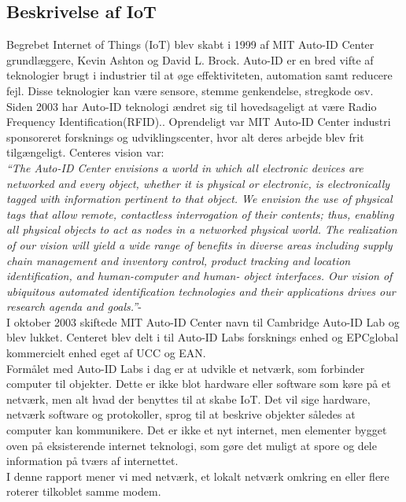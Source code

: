         \subsection{Beskrivelse af IoT}
        
        Begrebet Internet of Things (IoT) blev skabt i 1999 af MIT Auto-ID Center grundlæggere, Kevin Ashton og David L. Brock.\autocite{Hashmi2017} Auto-ID er en bred vifte af teknologier brugt i industrier til at øge effektiviteten, automation samt reducere fejl. Disse teknologier kan være sensore, stemme genkendelse, stregkode osv.
        Siden 2003 har Auto-ID teknologi ændret sig til hovedsageligt at være Radio Frequency Identification(RFID).\autocite{Sundmaeker2010}. Oprendeligt var MIT Auto-ID Center industri sponsoreret forsknings og udviklingscenter, hvor alt deres arbejde blev frit tilgængeligt. Centeres vision var:\\
        \textit{``The Auto-ID Center envisions a world in which all electronic devices are networked and every object, whether it is physical or electronic, is electronically tagged with information pertinent to that object.  We envision the use of physical tags that allow remote, contactless interrogation of their contents; thus, enabling all physical objects to act as nodes in a networked physical world. The realization of our vision will yield a wide range of benefits in diverse areas including supply chain management and inventory control, product tracking and location identification, and human-computer and human- object interfaces. Our vision of ubiquitous automated identification technologies and their applications drives our research agenda and goals.''}- \autocite[Kapitel 2,p. ~4]{Sarma2001} \\
        I oktober 2003 skiftede MIT Auto-ID Center navn til Cambridge Auto-ID Lab og blev lukket. Centeret blev delt i til Auto-ID Labs forsknings enhed og EPCglobal kommercielt enhed eget af UCC og EAN.\autocite{Sundmaeker2010}
        \\Formålet med Auto-ID Labs i dag er at udvikle et netværk, som forbinder computer til objekter. Dette er ikke blot hardware %
        eller software som køre på et netværk, men alt hvad der benyttes til at skabe IoT. Det vil sige hardware, netværk software og protokoller, sprog til at beskrive objekter således at computer kan kommunikere. Det er ikke et nyt internet, men elementer bygget oven på eksisterende internet teknologi, som gøre det muligt at spore og dele information på tværs af internettet.\autocite{Sundmaeker2010} \\
        I denne rapport mener vi med netværk, et lokalt netværk omkring en eller flere roterer tilkoblet samme modem. 
        \\
        \newpage
  
